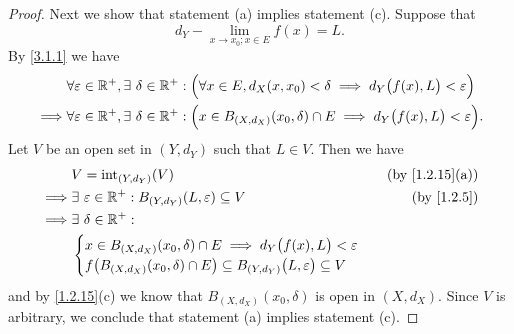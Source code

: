 \begin{proof}
  Next we show that statement (a) implies statement (c).
  Suppose that
  \[
    d_Y - \lim_{x \to x_0 ; x \in E} f(x) = L.
  \]
  By \cref{3.1.1} we have
  \begin{align*}
             & \forall \varepsilon \in \mathbb{R}^+, \exists\ \delta \in \mathbb{R}^+ : \Big(\forall x \in E, d_X(x, x_0) < \delta \implies d_Y\big(f(x), L\big) < \varepsilon\Big)   \\
    \implies & \forall \varepsilon \in \mathbb{R}^+, \exists\ \delta \in \mathbb{R}^+ : \Big(x \in B_{(X, d_X)}(x_0, \delta) \cap E \implies d_Y\big(f(x), L\big) < \varepsilon\Big).
  \end{align*}
  Let \(V\) be an open set in \((Y, d_Y)\) such that \(L \in V\).
  Then we have
  \begin{align*}
             & V = \text{int}_{(Y, d_Y)}(V)                                                                           & \text{(by \cref{1.2.15}(a))} \\
    \implies & \exists\ \varepsilon \in \R^+ : B_{(Y, d_Y)}(L, \varepsilon) \subseteq V                               & \text{(by \cref{1.2.5})}     \\
    \implies & \exists\ \delta \in \R^+ :                                                                                                            \\
             & \begin{cases}
                 x \in B_{(X, d_X)}(x_0, \delta) \cap E \implies d_Y\big(f(x), L\big) < \varepsilon \\
                 f\big(B_{(X, d_X)}(x_0, \delta) \cap E\big) \subseteq B_{(Y, d_Y)}\big(L, \varepsilon\big) \subseteq V
               \end{cases}
  \end{align*}
  and by \cref{1.2.15}(c) we know that \(B_{(X, d_X)}(x_0, \delta)\) is open in \((X, d_X)\).
  Since \(V\) is arbitrary, we conclude that statement (a) implies statement (c).


\end{proof}
